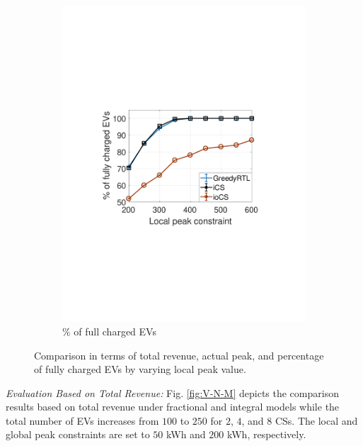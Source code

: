 \documentclass[journal]{IEEEtran}
\newcommand{\revv}[1]{{\color{black}#1}}%
\begin{document}
\begin{figure}[t!]
\begin{subfigure}[b]{0.25\textwidth}
\begin{center}
						\includegraphics[width=\textwidth]{acc-c.pdf}
						\caption{\revv{\% of full charged EVs}}
						\label{fig:acc-c}
					\end{center}
				\end{subfigure}%
				\caption{\revv{Comparison in terms of total revenue, actual peak, and percentage of fully charged EVs by varying local peak value}.} 
				\label{fig:peak_local}
			\vspace{-4mm}
			\end{figure}
\textit{\revv{Evaluation Based on Total Revenue}:}
\revv{Fig. \ref{fig:V-N-M} depicts the comparison results based on total revenue under fractional and integral models} while the total number of EVs increases from \revv{$100$ to $250$} for $2$, $4$, and $8$ CSs. \revv{The local and global peak constraints are set to $50$ kWh and $200$ kWh, respectively.}
\end{document}
